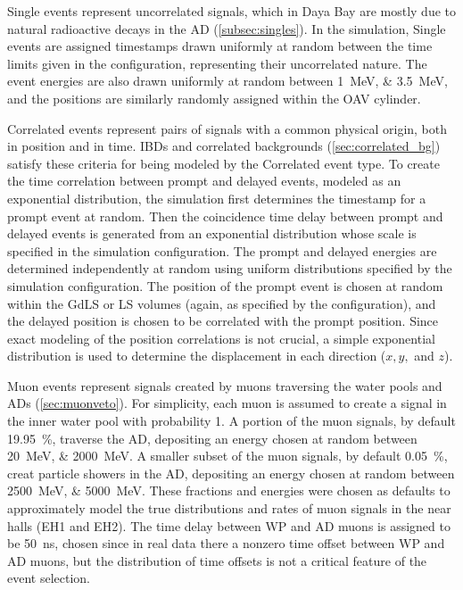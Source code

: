 Single events represent uncorrelated signals,
which in Daya Bay are mostly due to natural radioactive decays in the AD
(\cref{subsec:singles}).
In the simulation, Single events are assigned timestamps
drawn uniformly at random between the time limits given in the configuration,
representing their uncorrelated nature.
The event energies are also drawn uniformly at random
between \SIlist{1;3.5}{\MeV},
and the positions are similarly randomly assigned
within the OAV cylinder.

Correlated events represent pairs of signals
with a common physical origin, both in position and in time.
IBDs and correlated backgrounds (\cref{sec:correlated_bg})
satisfy these criteria for being modeled by the Correlated event type.
To create the time correlation between prompt and delayed events,
modeled as an exponential distribution,
the simulation first determines the timestamp for a prompt event at random.
Then the coincidence time delay between prompt and delayed events is generated
from an exponential distribution
whose scale is specified in the simulation configuration.
The prompt and delayed energies are determined independently at random
using uniform distributions specified by the simulation configuration.
The position of the prompt event is chosen at random
within the GdLS or LS volumes (again, as specified by the configuration),
and the delayed position is chosen to be correlated with the prompt position.
Since exact modeling of the position correlations is not crucial,
a simple exponential distribution is used to determine the displacement
in each direction ($x,y,$ and $z$).

Muon events represent signals created by muons traversing
the water pools and ADs (\cref{sec:muonveto}).
For simplicity, each muon is assumed to create a signal
in the inner water pool with probability \num{1}.
A portion of the muon signals, by default \SI{19.95}{\percent},
traverse the AD, depositing an energy chosen at random between
\SIlist{20;2000}{\MeV}.
A smaller subset of the muon signals, by default \SI{0.05}{\percent},
creat particle showers in the AD, depositing an energy chosen at random between
\SIlist{2500;5000}{\MeV}.
These fractions and energies were chosen as defaults to approximately model
the true distributions and rates of muon signals in the near halls (EH1 and EH2).
The time delay between WP and AD muons is assigned to be \SI{50}{\ns},
chosen since in real data there a nonzero time offset between WP and AD muons,
but the distribution of time offsets
is not a critical feature of the event selection.

